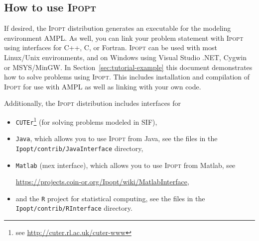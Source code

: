 \documentclass[10pt]{article}
\newcommand{\Ipopt}{\textsc{Ipopt}\xspace}
\begin{document}
\subsection{How to use \Ipopt}
If desired, the \Ipopt distribution generates an executable for the
modeling environment AMPL. As well, you can link your problem
statement with \Ipopt using interfaces for C++, C, or Fortran.
\Ipopt can be used with most Linux/Unix environments, and on Windows
using Visual Studio .NET, Cygwin or MSYS/MinGW.  In
Section~\ref{sec:tutorial-example} this document demonstrates how to
solve problems using \Ipopt. This includes installation and
compilation of \Ipopt for use with AMPL as well as linking with your
own code.

Additionally, the \Ipopt distribution includes interfaces for
\begin{itemize}
\item {\tt CUTEr}\footnote{see \url{http://cuter.rl.ac.uk/cuter-www}} (for
  solving problems modeled in SIF),

\item {\tt Java}, which allows you to use \Ipopt from Java, see the files in the
\texttt{Ipopt/contrib/JavaInterface} directory,
  
\item {\tt Matlab} (mex interface), which allows you to use \Ipopt from Matlab, see

\centerline{\url{https://projects.coin-or.org/Ipopt/wiki/MatlabInterface},}

\item and the {\tt R} project for statistical computing, see the files in the
\texttt{Ipopt/contrib/RInterface} directory.
\end{itemize}
\end{document}
